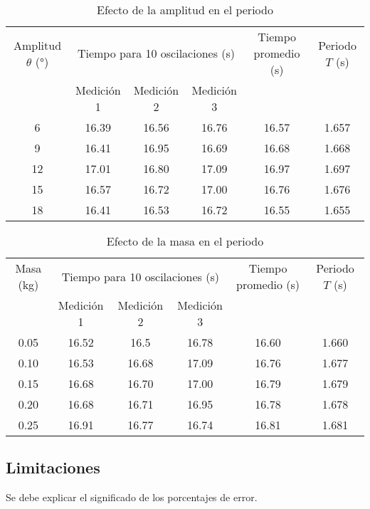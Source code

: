 \documentclass[twocolumn]{article}
\numberwithin{table}{section}
\begin{document}
\begin{table}[ht]
  \centering
  \caption{Efecto de la amplitud en el periodo}\label{tab:amplitud_periodo}
  \begin{tabular}{cccccc}
    \toprule
    Amplitud $\theta$ (°) & \multicolumn{3}{c}{Tiempo para 10
    oscilaciones (s)} & Tiempo promedio (s) & Periodo $T$ (s) \\
    \cmidrule(lr){2-4}
    & Medición 1 & Medición 2 & Medición 3 &  &  \\
    \midrule
    6   & 16.39 & 16.56 & 16.76 & 16.57 & 1.657 \\
    9   & 16.41 & 16.95 & 16.69 & 16.68 & 1.668 \\
    12  & 17.01 & 16.80 & 17.09 & 16.97 & 1.697 \\
    15  & 16.57 & 16.72 & 17.00 & 16.76 & 1.676 \\
    18  & 16.41 & 16.53 & 16.72 & 16.55 & 1.655 \\
    \bottomrule
  \end{tabular}
\end{table}

\begin{table}[ht]
  \centering
  \caption{Efecto de la masa en el periodo}\label{tab:masa_periodo}
  \begin{tabular}{cccccc}
    \toprule
    Masa (kg) & \multicolumn{3}{c}{Tiempo para 10 oscilaciones
    (s)} & Tiempo promedio (s) & Periodo $T$ (s) \\
    \cmidrule(lr){2-4}
    & Medición 1 & Medición 2 & Medición 3 &  &  \\
    \midrule
    0.05  & 16.52 & 16.5  & 16.78 & 16.60 & 1.660 \\
    0.10  & 16.53 & 16.68 & 17.09 & 16.76 & 1.677 \\
    0.15  & 16.68 & 16.70 & 17.00 & 16.79 & 1.679 \\
    0.20  & 16.68 & 16.71 & 16.95 & 16.78 & 1.678 \\
    0.25  & 16.91 & 16.77 & 16.74 & 16.81 & 1.681 \\
    \bottomrule
  \end{tabular}
\end{table}

\twocolumn

\subsection{Limitaciones}

\textcolor{workblue}{Se debe explicar el significado de los porcentajes de
error.}
\end{document}
